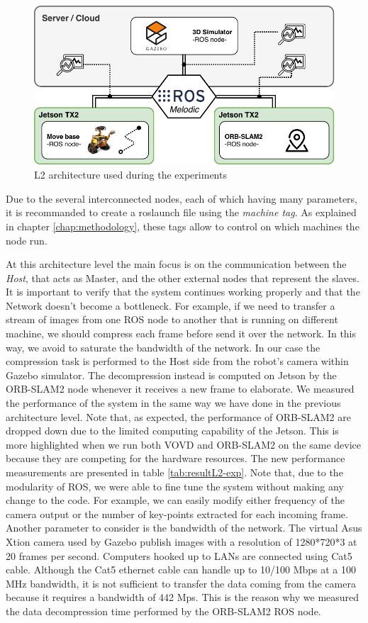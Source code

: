 \begin{figure}[htbp]
	\centering
	\includegraphics[width=\textwidth]{images/L2-arch-exp}
	\caption{L2 architecture used during the experiments}
	\label{fig:l2arch-exp}
\end{figure}

Due to the several interconnected nodes, each of which having many parameters, it is recommanded to create a roslaunch file  using the \textit{machine tag}. As explained in chapter \ref{chap:methodology}, these tags allow to control on which machines the node run.

At this architecture level the main focus is on the communication between the \textit{Host}, that acts as Master, and the other external nodes that represent the slaves. It is important to verify that the system continues working properly and that the Network doesn't become a bottleneck. For example, if we need to transfer a stream of images from one ROS node to another that is running on different machine, we should compress each frame before send it over the network. In this way, we avoid to saturate the bandwidth of the network. In our case the compression task is performed to the Host side from the robot's camera within Gazebo simulator. The decompression instead is computed on Jetson by the ORB-SLAM2 node whenever it receives a new frame to elaborate.
We measured the performance of the system in the same way we have done in the previous architecture level.
Note that, as expected, the performance of ORB-SLAM2 are dropped down due to the limited computing capability of the Jetson. This is more highlighted when we run both VOVD and ORB-SLAM2 on the same device because they are competing for the hardware resources.
The new performance measurements are presented in table \ref{tab:resultL2-exp}.
Note that, due to the modularity of ROS, we were able to fine tune the system without making any change to the code. For example, we can easily modify either frequency of the camera output or the number of key-points extracted for each incoming frame.
Another parameter to consider is the bandwidth of the network. The virtual Asus Xtion camera used by Gazebo publish images with a resolution of 1280*720*3 at 20 frames per second.
Computers hooked up to LANs are connected using Cat5 cable. Although the Cat5 ethernet cable can handle up to 10/100 Mbps at a 100 MHz bandwidth, it is not sufficient to transfer the data coming from the camera because it requires a bandwidth of 442 Mps.
This is the reason why we measured the data decompression time performed by the ORB-SLAM2 ROS node.

